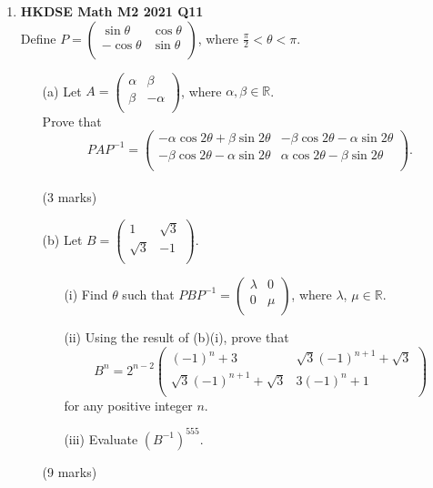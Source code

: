 \documentclass{report}
\begin{document}
\begin{enumerate}
	\newpage

	\item \textbf{HKDSE Math M2 2021 Q11}\\
	Define $P = \begin{pmatrix}
		\sin{\theta}&\cos{\theta}\\
		-\cos{\theta}&\sin{\theta}\\
		\end{pmatrix}$, where $\displaystyle \frac{\pi}{2} < \theta < \pi$.
	\begin{enumerate}
		\item [(a)] Let $A = 
			\begin{pmatrix}
			\alpha&\beta\\
			\beta&-\alpha\\
			\end{pmatrix}$, where $\alpha, \beta \in \mathbb{R}$.\\
			Prove that $$PAP^{-1} = \begin{pmatrix}
			-\alpha \cos{2\theta}+\beta \sin{2\theta} &-\beta\cos{2\theta}-\alpha \sin{2\theta}\\
			-\beta\cos{2\theta}-\alpha\sin{2\theta}&\alpha\cos{2\theta}-\beta \sin{2\theta}\\
			\end{pmatrix}.$$ \\(3 marks)
		\item[(b)]Let $B = \begin{pmatrix}
			1&\sqrt{3}\\
			\sqrt{3}&-1\\
			\end{pmatrix}$.
		\begin{enumerate}
			\item [(i)] Find $\theta$ such that $PBP^{-1} = \begin{pmatrix}
				\lambda&0\\
				0&\mu\\
				\end{pmatrix}$, where $\lambda$, $\mu \in \mathbb{R}$.
			\item [(ii)]Using the result of (b)(i), prove that $$B^n = 2^{n-2} \begin{pmatrix}
				(-1)^n+3&\sqrt{3}(-1)^{n+1} + \sqrt{3}\\
				\sqrt{3}(-1)^{n+1}+\sqrt{3}&3(-1)^n+1\\
				\end{pmatrix}$$
				for any positive integer $n$.
			\item [(iii)] Evaluate $(B^{-1})^{555}$. 
		\end{enumerate}
		(9 marks)
	\end{enumerate}


\end{enumerate}
\end{document}
